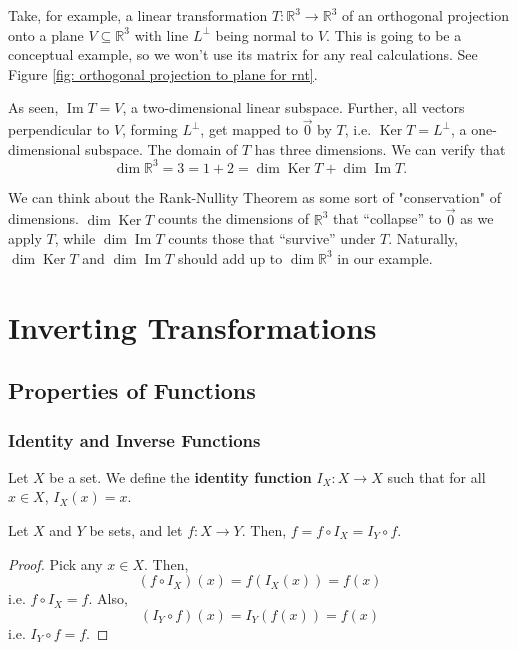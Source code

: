 \documentclass[]{book}
\DeclareMathOperator{\spacedim}{dim}
\DeclareMathOperator{\image}{Im}
\DeclareMathOperator{\kernel}{Ker}
\newcommand{\R}{\ensuremath{\mathbb{R}}}
\begin{document}
Take, for example, a linear transformation $T:\R^3 \to \R^3$ of an orthogonal projection onto a plane $V \subseteq \R^3$ with line $L^{\perp}$ being normal to $V$. This is going to be a conceptual example, so we won't use its matrix for any real calculations. See Figure \ref{fig: orthogonal projection to plane for rnt}. 

As seen, $\image{T}=V$, a two-dimensional linear subspace. Further, all vectors perpendicular to $V$, forming $L^{\perp}$, get mapped to $\vec{0}$ by $T$, i.e. $\kernel{T}=L^{\perp}$, a one-dimensional subspace. The domain of $T$ has three dimensions. We can verify that
\[\spacedim\R^3 = 3 = 1 + 2 = \spacedim\kernel{T} + \spacedim\image{T}.\]

We can think about the Rank-Nullity Theorem as some sort of "conservation" of dimensions. $\dim\kernel{T}$ counts the dimensions of $\R^3$ that ``collapse'' to $\vec{0}$ as we apply $T$, while $\dim\image{T}$ counts those that ``survive'' under $T$. Naturally, $\dim\kernel{T}$ and $\dim\image{T}$ should add up to $\dim\R^3$ in our example.


\chapter{Inverting Transformations}
\section{Properties of Functions}

\subsection{Identity and Inverse Functions}
\begin{definition}
    \label{defn: identity function}
    Let $X$ be a set. We define the \textbf{identity function} $I_X: X \to X$ such that for all $x \in X$, $I_X(x)=x$.
\end{definition}

\begin{theorem}
    \label{thm: composition of function and identity function}
    Let $X$ and $Y$ be sets, and let $f:X \to Y$. Then, $f=f \circ I_X = I_Y \circ f$.
\begin{proof}
    Pick any $x \in X$. Then, 
    \[\left(f\circ I_X \right)(x) = f\left(I_X\left(x\right)\right) = f(x)\]
    i.e. $f \circ I_X = f$. Also,
    \[\left(I_Y \circ f\right)(x) = I_Y\left(f(x)\right) = f(x)\]
    i.e. $I_Y \circ f = f$. 
\end{proof}
\end{theorem}
\end{document}
